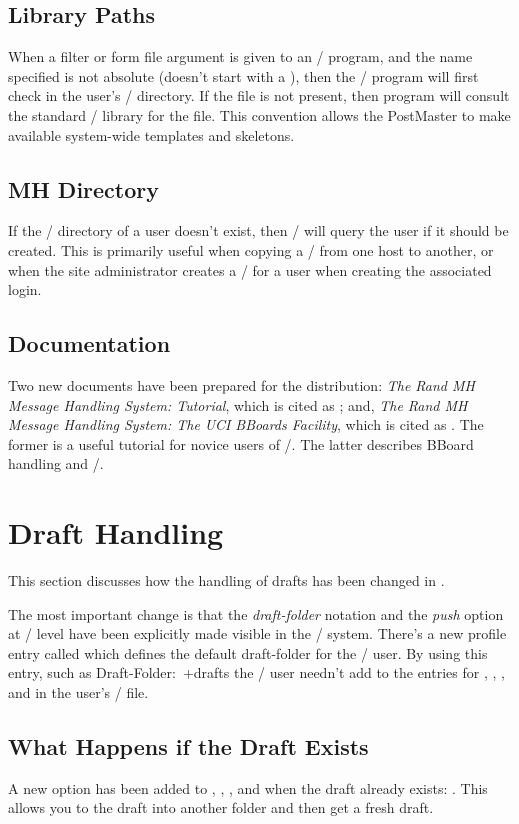 \subsection{Library Paths}
When a filter or form file argument is given to an \MH/ program,
and the name specified is not absolute (doesn't start with a \file{/\/}),
then the \MH/ program will first check in the user's \MH/ directory.
If the file is not present,
then program will consult the standard \MH/ library for the file.
This convention allows the PostMaster to make available system-wide
templates and skeletons.

\subsection{MH Directory}
If the \MH/ directory of a user doesn't exist,
then \MH/ will query the user if it should be created.
This is primarily useful when copying a \profile/ from one host to another,
or when the site administrator creates a \profile/ for a user when creating
the associated login.

\subsection{Documentation}
Two new documents have been prepared for the  distribution:
{\sl The Rand MH Message Handling System: Tutorial},
which is cited as \cite{MH.TUT};
and,
{\sl The Rand MH Message Handling System: The UCI BBoards Facility},
which is cited as \cite{MH.BB}.
The former is a useful tutorial for novice users of \MH/.
The latter describes BBoard handling and \MH/.

\section{Draft Handling}
This section discusses how the handling of drafts has been changed in .

The most important change is that the {\it draft-folder} notation
and the {\it push} option at \whatnow/ level have been explicitly made
visible in the \MH/ system.
There's a new profile entry called  which defines the
default draft-folder for the \MH/ user.
By using this entry, such as \example Draft-Folder:\ +drafts\endexample
the \MH/ user needn't add  to the entries
for , , , and  in the user's
\profile/ file.

\subsection{What Happens if the Draft Exists}
A new option has been added to , , , and
 when the draft already exists: .
This allows you to  the draft into another folder and then get a
fresh draft.

